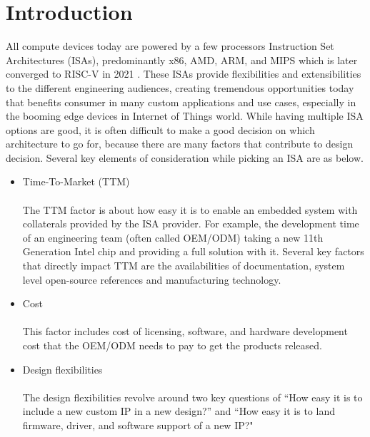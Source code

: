 \documentclass[]{rsos}%
\begin{document}
\maketitle


\section{Introduction}
All compute devices today are powered by a few processors Instruction Set Architectures
(ISAs), predominantly x86, AMD, ARM, and MIPS which is later converged to RISC-V in
2021  \cite{R5:1}. These ISAs provide flexibilities and extensibilities to the
different engineering audiences, creating tremendous opportunities today that benefits
consumer in many custom applications and use cases, especially in the booming edge devices
in Internet of Things world. While having multiple ISA options are good, it is often difficult to
make a good decision on which architecture to go for, because there are many factors that
contribute to design decision. Several key elements of consideration while picking an ISA are as below.

\renewcommand\labelitemi{\small$\bullet$} %
\begin{itemize} 
\itemsep=-1pt 		%
\itemindent=-3pt 	%
\item 
Time-To-Market (TTM) \\ \\
The TTM factor is about how easy it is to enable an embedded system with collaterals
provided by the ISA provider. For example, the development time of an engineering team
(often called OEM/ODM) taking a new 11th Generation Intel chip and providing a full
solution with it. Several key factors that directly impact TTM are the availabilities of
documentation, system level open-source references and manufacturing technology.
\\

\item 
Cost \\ \\
This factor includes cost of licensing, software, and hardware development cost that the
OEM/ODM needs to pay to get the products released.
\\

\item 
Design flexibilities \\ \\
The design flexibilities revolve around two key questions of “How easy it is to include a
new custom IP in a new design?” and “How easy it is to land firmware, driver, and
software support of a new IP?"
\end{itemize}
\end{document}
